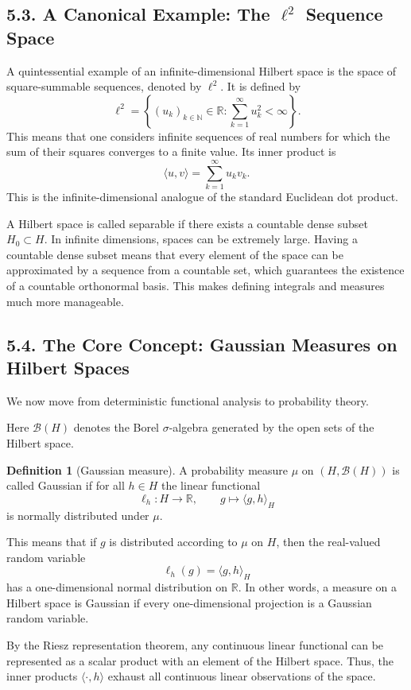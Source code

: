 \documentclass[11pt]{article}
\theoremstyle{definition}
\newtheorem{definition}{Definition}
\theoremstyle{remark}
\begin{document}
\subsection*{5.3. A Canonical Example: The $\ell^2$ Sequence Space}
A quintessential example of an infinite-dimensional Hilbert space is the space of square-summable sequences, denoted by $\ell^2$. It is defined by
\[
\ell^2=\left\{(u_k)_{k\in\mathbb N}\in\mathbb R:\sum_{k=1}^{\infty}u_k^2<\infty\right\}.
\]
This means that one considers infinite sequences of real numbers for which the sum of their squares converges to a finite value. Its inner product is
\[
\langle u,v\rangle=\sum_{k=1}^{\infty}u_kv_k.
\]
This is the infinite-dimensional analogue of the standard Euclidean dot product.

A Hilbert space is called separable if there exists a countable dense subset $H_0\subset H$. In infinite dimensions, spaces can be extremely large. Having a countable dense subset means that every element of the space can be approximated by a sequence from a countable set, which guarantees the existence of a countable orthonormal basis. This makes defining integrals and measures much more manageable.

\subsection*{5.4. The Core Concept: Gaussian Measures on Hilbert Spaces}
We now move from deterministic functional analysis to probability theory.

Here $\mathcal B(H)$ denotes the Borel $\sigma$-algebra generated by the open sets of the Hilbert space.

\begin{definition}[Gaussian measure]
A probability measure $\mu$ on $(H,\mathcal B(H))$ is called Gaussian if for all $h\in H$ the linear functional
\[
\ell_h:H\to\mathbb R,\qquad g\mapsto \langle g,h\rangle_H
\]
is normally distributed under $\mu$.
\end{definition}

This means that if $g$ is distributed according to $\mu$ on $H$, then the real-valued random variable
\[
\ell_h(g)=\langle g,h\rangle_H
\]
has a one-dimensional normal distribution on $\mathbb R$. In other words, a measure on a Hilbert space is Gaussian if every one-dimensional projection is a Gaussian random variable.

By the Riesz representation theorem, any continuous linear functional can be represented as a scalar product with an element of the Hilbert space. Thus, the inner products $\langle \cdot,h\rangle$ exhaust all continuous linear observations of the space.
\end{document}
